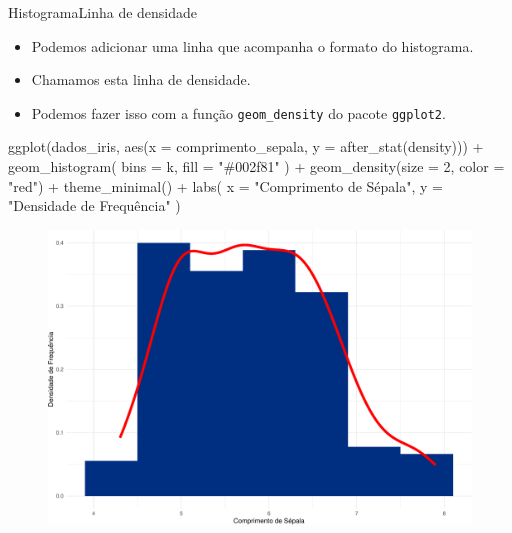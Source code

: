 \documentclass[
  10pt,
  ignorenonframetext,
]{beamer}
\newenvironment{Shaded}{\begin{snugshade}}{\end{snugshade}}
\newcommand{\AttributeTok}[1]{\textcolor[rgb]{0.40,0.45,0.13}{#1}}
\newcommand{\DecValTok}[1]{\textcolor[rgb]{0.68,0.00,0.00}{#1}}
\newcommand{\FunctionTok}[1]{\textcolor[rgb]{0.28,0.35,0.67}{#1}}
\newcommand{\NormalTok}[1]{\textcolor[rgb]{0.00,0.23,0.31}{#1}}
\newcommand{\SpecialCharTok}[1]{\textcolor[rgb]{0.37,0.37,0.37}{#1}}
\newcommand{\StringTok}[1]{\textcolor[rgb]{0.13,0.47,0.30}{#1}}
\providecommand{\tightlist}{%
  \setlength{\itemsep}{0pt}\setlength{\parskip}{0pt}}\usepackage{longtable,booktabs,array}
\begin{document}
\begin{frame}[fragile]{Histograma\newline Linha de densidade}
\protect\hypertarget{histogramalinha-de-densidade}{}
\begin{itemize}
\tightlist
\item
  Podemos adicionar uma linha que acompanha o formato do histograma.
\item
  Chamamos esta linha de densidade.
\item
  Podemos fazer isso com a função \texttt{geom\_density} do pacote
  \texttt{ggplot2}.
\end{itemize}

\begin{Shaded}
\begin{Highlighting}[]
\FunctionTok{ggplot}\NormalTok{(dados\_iris, }\FunctionTok{aes}\NormalTok{(}\AttributeTok{x =}\NormalTok{ comprimento\_sepala,}
                      \AttributeTok{y =} \FunctionTok{after\_stat}\NormalTok{(density))) }\SpecialCharTok{+}
  \FunctionTok{geom\_histogram}\NormalTok{(}
    \AttributeTok{bins =}\NormalTok{ k,}
    \AttributeTok{fill =} \StringTok{"\#002f81"}
\NormalTok{  ) }\SpecialCharTok{+}
  \FunctionTok{geom\_density}\NormalTok{(}\AttributeTok{size =} \DecValTok{2}\NormalTok{, }\AttributeTok{color =} \StringTok{"red"}\NormalTok{) }\SpecialCharTok{+}
  \FunctionTok{theme\_minimal}\NormalTok{() }\SpecialCharTok{+}
  \FunctionTok{labs}\NormalTok{(}
    \AttributeTok{x =} \StringTok{"Comprimento de Sépala"}\NormalTok{,}
    \AttributeTok{y =} \StringTok{"Densidade de Frequência"}
\NormalTok{  )}
\end{Highlighting}
\end{Shaded}
\end{frame}

\begin{frame}
\begin{figure}

{\centering \includegraphics[width=1\textwidth,height=\textheight]{exploracao-visualizacao_files/figure-beamer/unnamed-chunk-73-1.pdf}

}

\end{figure}
\end{frame}
\end{document}
